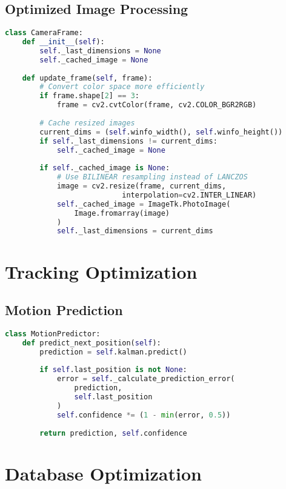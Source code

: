 \subsection{Optimized Image Processing}
\begin{lstlisting}[language=Python]
class CameraFrame:
    def __init__(self):
        self._last_dimensions = None
        self._cached_image = None
        
    def update_frame(self, frame):
        # Convert color space more efficiently
        if frame.shape[2] == 3:
            frame = cv2.cvtColor(frame, cv2.COLOR_BGR2RGB)
            
        # Cache resized images
        current_dims = (self.winfo_width(), self.winfo_height())
        if self._last_dimensions != current_dims:
            self._cached_image = None
            
        if self._cached_image is None:
            # Use BILINEAR resampling instead of LANCZOS
            image = cv2.resize(frame, current_dims, 
                           interpolation=cv2.INTER_LINEAR)
            self._cached_image = ImageTk.PhotoImage(
                Image.fromarray(image)
            )
            self._last_dimensions = current_dims
\end{lstlisting}

\section{Tracking Optimization}

\subsection{Motion Prediction}
\begin{lstlisting}[language=Python]
class MotionPredictor:
    def predict_next_position(self):
        prediction = self.kalman.predict()
        
        if self.last_position is not None:
            error = self._calculate_prediction_error(
                prediction,
                self.last_position
            )
            self.confidence *= (1 - min(error, 0.5))
            
        return prediction, self.confidence
\end{lstlisting}

\section{Database Optimization}

